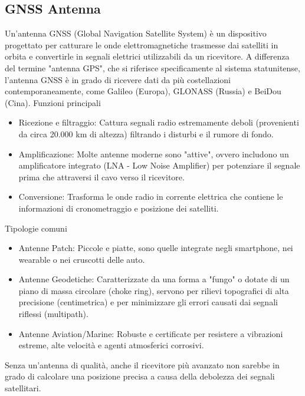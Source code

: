 \documentclass[a4paper,14pt]{article}
\begin{document}
\subsection{GNSS Antenna}
Un'antenna GNSS (Global Navigation Satellite System) è un dispositivo progettato per catturare le onde elettromagnetiche trasmesse dai satelliti in orbita e convertirle in segnali elettrici utilizzabili da un ricevitore.
A differenza del termine "antenna GPS", che si riferisce specificamente al sistema statunitense, l'antenna GNSS è in grado di ricevere dati da più costellazioni contemporaneamente, come Galileo (Europa), GLONASS (Russia) e BeiDou (Cina).
Funzioni principali\\
\begin{itemize}
\item Ricezione e filtraggio: Cattura segnali radio estremamente deboli (provenienti da circa 20.000 km di altezza) filtrando i disturbi e il rumore di fondo.
\item Amplificazione: Molte antenne moderne sono "attive", ovvero includono un amplificatore integrato (LNA - Low Noise Amplifier) per potenziare il segnale prima che attraversi il cavo verso il ricevitore.
\item Conversione: Trasforma le onde radio in corrente elettrica che contiene le informazioni di cronometraggio e posizione dei satelliti.
\end{itemize}
Tipologie comuni\\
\begin{itemize}
\item Antenne Patch: Piccole e piatte, sono quelle integrate negli smartphone, nei wearable o nei cruscotti delle auto.
\item Antenne Geodetiche: Caratterizzate da una forma a "fungo" o dotate di un piano di massa circolare (choke ring), servono per rilievi topografici di alta precisione (centimetrica) e per minimizzare gli errori causati dai segnali riflessi (multipath).
\item Antenne Aviation/Marine: Robuste e certificate per resistere a vibrazioni estreme, alte velocità e agenti atmosferici corrosivi.
\end{itemize}
Senza un'antenna di qualità, anche il ricevitore più avanzato non sarebbe in grado di calcolare una posizione precisa a causa della debolezza dei segnali satellitari.
\end{document}
